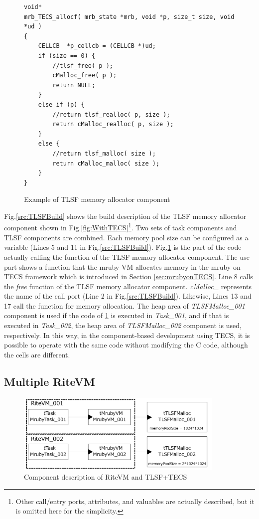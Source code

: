 \documentclass[a4j,12pt,oneside,openany,english]{jsbook}
\begin{document}
\begin{figure}[t]
\centering
\begin{lstlisting}
void*
mrb_TECS_allocf( mrb_state *mrb, void *p, size_t size, void *ud )
{
    CELLCB	*p_cellcb = (CELLCB *)ud;
    if (size == 0) {
        //tlsf_free( p );
        cMalloc_free( p );
        return NULL;
    }
    else if (p) {
        //return tlsf_realloc( p, size );
        return cMalloc_realloc( p, size );
    }
    else {
        //return tlsf_malloc( size );
        return cMalloc_malloc( size );
    }
}
\end{lstlisting}
\caption{Example of TLSF memory allocator component}  
\label{src:TLSFC}
\end{figure}

Fig.\ref{src:TLSFBuild} shows the build description of the TLSF memory allocator component shown in Fig.\ref{fig:WithTECS}\footnote{Other call/entry ports, attributes, and valuables are actually described, but it is omitted here for the simplicity.}.
Two sets of task components and TLSF components are combined.
Each memory pool size can be configured as a variable (Lines 5 and 11 in Fig.\ref{src:TLSFBuild}).
Fig.\ref{src:TLSFC} is the part of the code actually calling the function of the TLSF memory allocator component.
The use part shows a function that the mruby VM allocates memory in the mruby on TECS framework\cite{par:mrubyonTECS}\cite{par:mrubyonTECS3} which is introduced in Section \ref{sec:mrubyonTECS}.
Line 8 calls the {\it free} function of the TLSF memory allocator component.
{\it cMalloc\_} represents the name of the call port (Line 2 in Fig.\ref{src:TLSFBuild}).
Likewise, Lines 13 and 17 call the function for memory allocation.
The heap area of {\it TLSFMalloc\_001} component is used if the code of \ref{src:TLSFC} is executed in {\it Task\_001}, and if that is executed in {\it Task\_002}, the heap area of {\it TLSFMalloc\_002} component is used, respectively.
In this way, in the component-based development using TECS, it is possible to operate with the same code without modifying the C code, although the cells are different.

\subsection*{Multiple RiteVM}

\begin{figure}[t]
    \centering
    \includegraphics[width=10cm,clip]{figure/UseCase_mruby.pdf}
    \caption{Component description of RiteVM and TLSF+TECS}
    \label{fig:UseCase_mruby}
\end{figure}
\end{document}
